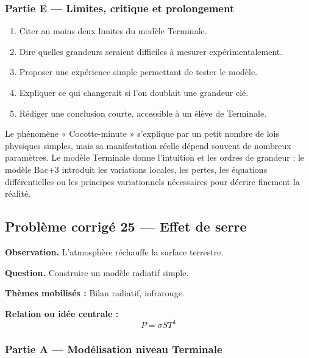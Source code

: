 \documentclass[11pt,a4paper]{article}
\begin{document}
\subsubsection*{Partie E — Limites, critique et prolongement}

\begin{enumerate}
  \item Citer au moins deux limites du modèle Terminale.
  \item Dire quelles grandeurs seraient difficiles à mesurer expérimentalement.
  \item Proposer une expérience simple permettant de tester le modèle.
  \item Expliquer ce qui changerait si l'on doublait une grandeur clé.
  \item Rédiger une conclusion courte, accessible à un élève de Terminale.
\end{enumerate}

\begin{corrigebox}
Le phénomène « Cocotte-minute » s'explique par un petit nombre de lois physiques simples, mais sa manifestation réelle dépend souvent de nombreux paramètres. Le modèle Terminale donne l'intuition et les ordres de grandeur ; le modèle Bac+3 introduit les variations locales, les pertes, les équations différentielles ou les principes variationnels nécessaires pour décrire finement la réalité.
\end{corrigebox}

\subsection{Problème corrigé 25 — Effet de serre}

\begin{exercicebox}
\textbf{Observation.} L'atmosphère réchauffe la surface terrestre.

\medskip
\textbf{Question.} Construire un modèle radiatif simple.

\medskip
\textbf{Thèmes mobilisés :} Bilan radiatif, infrarouge.

\medskip
\textbf{Relation ou idée centrale :}
\[
P=\sigma S T^4
\]
\end{exercicebox}

\subsubsection*{Partie A — Modélisation niveau Terminale}
\end{document}
